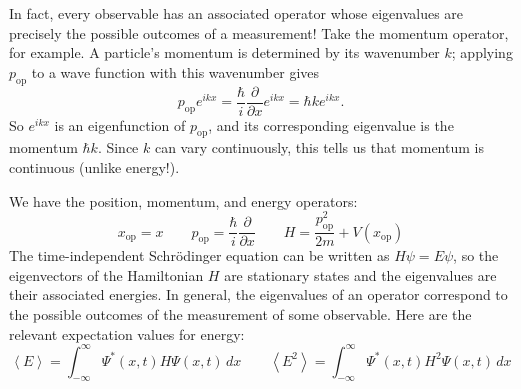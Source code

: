 \documentclass[../p052main.tex]{subfiles}
\begin{document}
In fact, every observable has an associated operator whose eigenvalues are precisely the possible outcomes of a measurement!
Take the momentum operator, for example.
A particle's momentum is determined by its wavenumber $k$; applying $p_\textrm{op}$ to a wave function with this wavenumber gives
\[ p_\textrm{op} e^{ikx} = \frac{\hbar}{i} \frac{\partial}{\partial x} e^{ikx} = \hbar k e^{ikx}. \]
So $e^{ikx}$ is an eigenfunction of $p_\textrm{op}$, and its corresponding eigenvalue is the momentum $\hbar k$.
Since $k$ can vary continuously, this tells us that momentum is continuous (unlike energy!).

\begin{summary}
    We have the position, momentum, and energy operators:
    \[ x_\textrm{op}= x \qquad p_\textrm{op} = \frac{\hbar}{i}\frac{\partial}{\partial x} \qquad H = \frac{p_\textrm{op}^2}{2m} + V(x_\textrm{op}) \]
    The time-independent Schrödinger equation can be written as $H \psi = E \psi$, so the eigenvectors of the Hamiltonian $H$ are stationary states and the eigenvalues are their associated energies.
    In general, the eigenvalues of an operator correspond to the possible outcomes of the measurement of some observable.
    Here are the relevant expectation values for energy:
    \[ \left< E \right> = \int_{-\infty}^{\infty} \Psi^*(x,t) H \Psi(x,t) \,dx \qquad \left< E^2 \right> = \int_{-\infty}^{\infty} \Psi^*(x,t) H^2 \Psi(x,t) \,dx \]
\end{summary}
\end{document}
